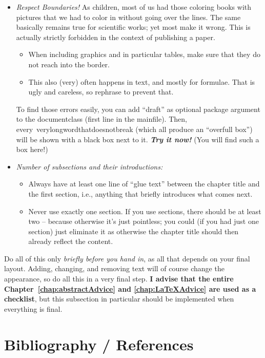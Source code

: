 \begin{itemize}
\begin{itemize}
  \end{itemize}
  \item \emph{Respect Boundaries!} As children, most of us had those coloring books with pictures that we had to color in without going over the lines. The same basically remains true for scientific works; yet most make it wrong. This is actually strictly forbidden in the context of publishing a paper.
  \begin{itemize}
    \item When including graphics and in particular tables, make sure that they do not reach into the border. 
    \item This also (very) often happens in text, and mostly for formulae. That is ugly and careless, so rephrase to prevent that.
  \end{itemize}
  To find those errors easily, you can add ``draft'' as optional package argument to the documentclass (first line in the mainfile). Then, every~\hbox{verylongwordthatdoesnotbreak} (which all produce an ``overfull box'') will be shown with a black box next to it. \textbf{\emph{Try it now!}} (You will find such a box here!)
  \item \emph{Number of subsections and their introductions:}
  \begin{itemize}
    \item Always have at least one line of ``glue text'' between the chapter title and the first section, i.e., anything that briefly introduces what comes next.
    \item Never use exactly one section. If you use sections, there should be at least two -- because otherwise it's just pointless; you could (if you had just one section) just eliminate it as otherwise the chapter title should then already reflect the content.
  \end{itemize}
\end{itemize}

Do all of this only \emph{briefly before you hand in}, as all that depends on your final layout. Adding, changing, and removing text will of course change the appearance, so do all this in a very final step. \textbf{I advise that the entire Chapter~\ref{chap:abstractAdvice} and \ref{chap:LaTeXAdvice} are used as a checklist}, but this subsection in particular should be implemented when everything is final.
    

    
\section{Bibliography / References}

